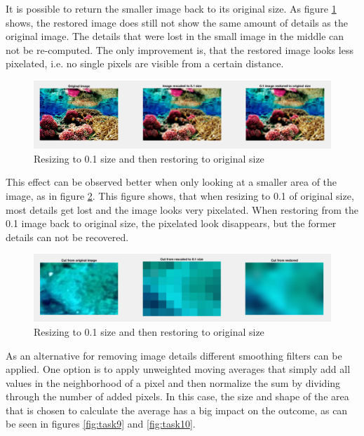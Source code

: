 \documentclass[11pt]{article}
\begin{document}
It is possible to return the smaller image back to its original size. As figure \ref{fig:task7} shows, the restored image does still not show the same amount of details as the original image. The details that were lost in the small image in the middle can not be re-computed. The only improvement is, that the restored image looks less pixelated, i.e. no single pixels are visible from a certain distance.   

\begin{figure}[!hbt]
  \includegraphics[width=\textwidth]{task7}
  \caption{Resizing to 0.1 size and then restoring to original size}
  \label{fig:task7}
\end{figure}

This effect can be observed better when only looking at a smaller area of the image, as in figure \ref{fig:task8}. This figure shows, that when resizing to 0.1 of original size, most details get lost and the image looks very pixelated. When restoring from the 0.1 image back to original size, the pixelated look disappears, but the former details can not be recovered.

\begin{figure}[!hbt]
  \includegraphics[width=\textwidth]{task8}
  \caption{Resizing to 0.1 size and then restoring to original size}
  \label{fig:task8}
\end{figure}

As an alternative for removing image details different smoothing filters can be applied. One option is to apply unweighted moving averages that simply add all values in the neighborhood of a pixel and then normalize the sum by dividing through the number of added pixels. In this case, the size and shape of the area that is chosen to calculate the average has a big impact on the outcome, as can be seen in figures \ref{fig:task9} and \ref{fig:task10}.
\end{document}
